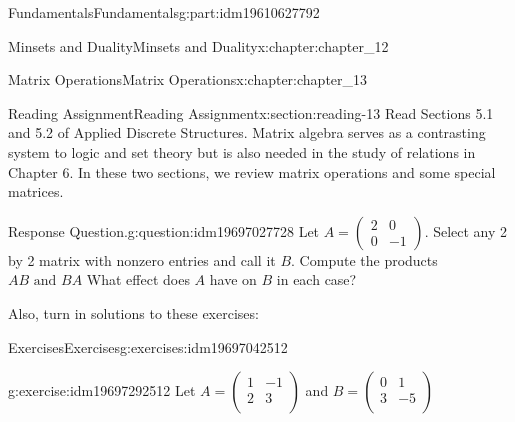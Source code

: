 \documentclass[oneside,10pt,]{book}
\numberwithin{equation}{section}
\begin{document}
\begin{partptx}{Fundamentals}{}{Fundamentals}{}{}{g:part:idm19610627792}
\begin{chapterptx}{Minsets and Duality}{}{Minsets and Duality}{}{}{x:chapter:chapter_12}
\end{chapterptx}
%
\typeout{************************************************}
\typeout{************************************************}
%
\begin{chapterptx}{Matrix Operations}{}{Matrix Operations}{}{}{x:chapter:chapter_13}
%
%
%
\typeout{************************************************}
\typeout{************************************************}
%
\begin{sectionptx}{Reading Assignment}{}{Reading Assignment}{}{}{x:section:reading-13}
Read Sections 5.1 and 5.2 of Applied Discrete Structures. Matrix algebra serves as a contrasting system to logic and set theory but is also needed in the study of relations in Chapter 6.  In these two sections, we review matrix operations and some special matrices.%
\begin{question}{Response Question.}{g:question:idm19697027728}%
Let \(A=\left(\begin{array}{cc} 2 & 0\\ 0 & -1 \end{array}\right)\). Select any 2 by 2 matrix with nonzero entries and call it \(B\). Compute the products \(AB \textrm{ and }BA\)  What effect does \(A\) have on \(B\) in each case?%
\end{question}
Also, turn in solutions to these exercises:%
%
%
\typeout{************************************************}
\typeout{************************************************}
%
\begin{exercises-subsection-numberless}{Exercises}{}{Exercises}{}{}{g:exercises:idm19697042512}
\par\medskip\noindent%
%
\begin{exercisegroup}
\begin{divisionexerciseeg}{1}{}{}{g:exercise:idm19697292512}%
Let \(A=\left(
\begin{array}{cc}
1 & -1 \\
2 & 3 \\
\end{array}
\right)\) and  \(B =\left(
\begin{array}{cc}
0 & 1 \\
3 & -5 \\
\end{array}
\right)\)%
\par
%
\begin{enumerate}[label=(\alph*)]

\end{enumerate}
\end{divisionexerciseeg}
\end{exercisegroup}
\end{exercises-subsection-numberless}
\end{sectionptx}
\end{chapterptx}
\end{partptx}
\end{document}
